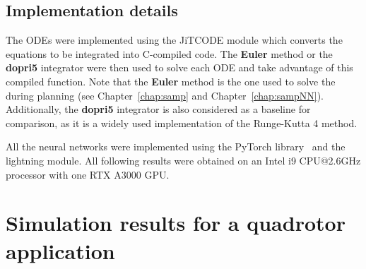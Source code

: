 
\subsection{Implementation details}

The ODEs were implemented using the JiTCODE \cite{cJit} module which converts the equations to be integrated into C-compiled code.
The \textbf{Euler} method or the \textbf{dopri5} integrator were then used to solve each ODE and take advantage of this compiled function.
Note that the \textbf{Euler} method is the one used to solve the  during planning (see Chapter~\ref{chap:samp} and Chapter~\ref{chap:sampNN}).
Additionally, the \textbf{dopri5} integrator is also considered as a baseline for comparison, as it is a widely used implementation of the Runge-Kutta 4 method.

All the neural networks were implemented using the PyTorch library~\cite{cPytorch} and the lightning module.
All following results were obtained on an Intel i9 CPU@2.6GHz processor with one RTX A3000 GPU. 

\section{Simulation results for a quadrotor application}\label{sec:nn_results}


